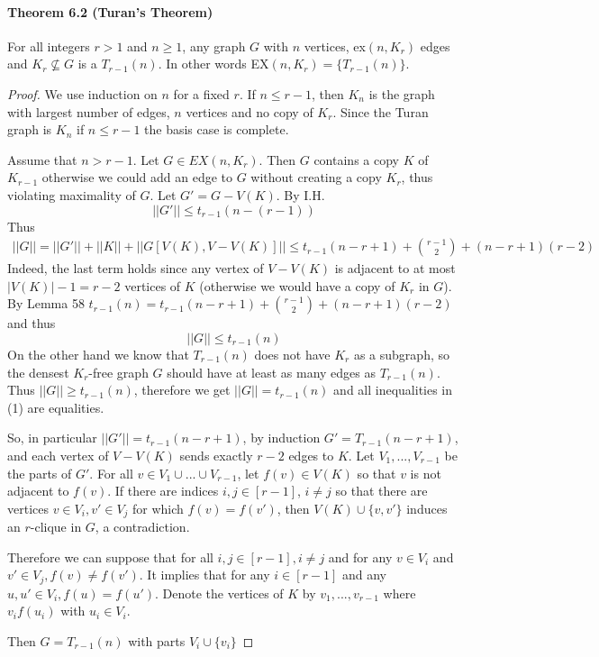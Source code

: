 \paragraph{Theorem 6.2 (Turan's Theorem)} For all integers $r>1$ and $n \geq 1$,
any graph $ G $ with $ n $ vertices, ex$(n,K_r)$ edges and $ K_r \nsubseteq G $ 
is a $ T_{r-1}(n) $. In other words EX$(n,K_r) = \{T_{r-1}(n)\}$.
\begin{proof}
    We use induction on $n$ for a fixed $r$. If $n \leq r-1$, then $K_n$ is the 
    graph with largest number of edges, $n$ vertices and no copy of $K_r$. 
    Since the Turan graph is $K_n$ if $n \leq r-1$ the basis case is complete.

    \smallskip \noindent
    Assume that $n > r-1$. Let $G \in EX(n,K_r)$. Then $G$ contains a copy $K$
    of $K_{r-1}$ otherwise we could add an edge to $G$ without creating a copy 
    $K_r$, thus violating maximality of $G$. Let $G' = G-V(K)$. By I.H.
    $$||G'|| \leq t_{r-1}(n-(r-1))$$
    Thus 
    \begin{align}
     ||G|| = ||G'|| + ||K|| + ||G[V(K), V-V(K)]||  
    \leq t_{r-1}(n-r+1) + \binom{r-1}{2} + (n-r+1)(r-2) 
    \end{align}
    Indeed, the last term holds since any vertex of $V-V(K)$ is adjacent to at 
    most $|V(K)|-1=r-2$ vertices of $K$ (otherwise we would have a copy of 
    $K_r$ in $G$).
    By Lemma 58 $t_{r-1}(n) = t_{r-1}(n-r+1) + \binom{r-1}{2} + (n-r+1)(r-2)$
    and thus
    $$||G|| \leq t_{r-1}(n)$$
    On the other hand we know that $T_{r-1}(n)$ does not have $K_r$ as a 
    subgraph, so the densest $K_r$-free graph $G$ should have at least as many
    edges as $T_{r-1}(n)$. Thus $||G|| \geq t_{r-1}(n)$, therefore we get 
    $||G|| = t_{r-1}(n)$ and all inequalities in (1) are equalities.
    
    \smallskip \noindent
    So, in particular $||G'|| = t_{r-1}(n-r+1)$, by induction 
    $G' = T_{r-1}(n-r+1)$, and each vertex of $V -V(K)$ sends exactly $r-2$ 
    edges to $K$. Let $V_1,...,V_{r-1}$ be the parts of $G'$. For all 
    $v \in V_1 \cup ... \cup V_{r-1}$, let $f(v) \in V(K)$ so that $v$ is not 
    adjacent to $f(v)$. If there are indices $i,j \in [r-1]$, $i\neq j$ so that 
    there are vertices $v \in V_i, v' \in V_j$ for which $f(v) = f(v')$, then
    $V(K) \cup \{v,v'\}$ induces an $r$-clique in $G$, a contradiction.
    
    Therefore we can suppose that for all $i,j \in [r-1], i \neq j$ and for any
    $v \in V_i$ and $v' \in V_j, f(v) \neq f(v')$. It implies that for any 
    $i \in [r-1]$ and any $u,u' \in V_i, f(u) = f(u')$. Denote the vertices 
    of $K$ by $v_1,...,v_{r-1}$ where $v_if(u_i)$ with $u_i \in V_i$.
    
    Then $G = T_{r-1}(n)$ with parts $V_i \cup \{v_i\}$
\end{proof}

